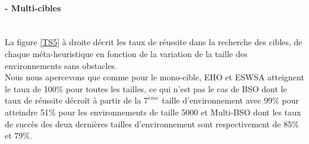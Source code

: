 	\noindent
	\begin{minipage}[t]{0.5\textwidth}
		\paragraph{- Multi-cibles}
		\textbf{}\\
		La figure \ref{TS5} à droite décrit les taux de réussite dans la recherche des cibles, de chaque méta-heuristique en fonction de la variation de la taille des environnements sans obstacles.\\
		Nous nous apercevons que comme pour le mono-cible, EHO et ESWSA atteignent le taux de 100\% pour toutes les tailles, ce qui n'est pas le cas de BSO dont le taux de réussite décroît à partir de la $7^{\grave{e}me}$ taille d'environnement avec 99\% pour atteindre 51\% pour les environnements de taille 5000 et Multi-BSO dont les taux de succès des deux dernières tailles d'environnement sont respectivement de 85\% et 79\%.
		
	\end{minipage}\hfill
	\begin{minipage}[t]{0.55\textwidth}
		\captionsetup{width=0.8\linewidth}
		\centering{}
		\label{TS5}
	\end{minipage}\hfill
	
	
